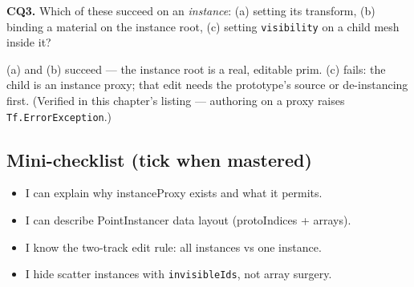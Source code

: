 \noindent\textbf{CQ3.} Which of these succeed on an \emph{instance}:
(a) setting its transform, (b) binding a material on the instance root,
(c) setting \texttt{visibility} on a child mesh inside it?
\begin{DrillSolution}
(a) and (b) succeed --- the instance root is a real, editable prim. (c)
fails: the child is an instance proxy; that edit needs the prototype's
source or de-instancing first. (Verified in this chapter's listing ---
authoring on a proxy raises \texttt{Tf.ErrorException}.)
\end{DrillSolution}

\subsection*{Mini-checklist (tick when mastered)}
\begin{itemize}[leftmargin=*]
  \item[$\square$] I can explain why instanceProxy exists and what it permits.
  \item[$\square$] I can describe PointInstancer data layout (protoIndices + arrays).
  \item[$\square$] I know the two-track edit rule: all instances vs one instance.
  \item[$\square$] I hide scatter instances with \texttt{invisibleIds}, not array surgery.
\end{itemize}
